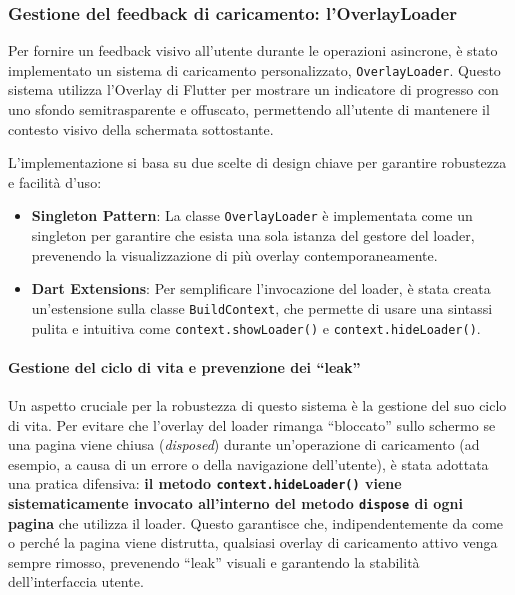 \subsubsection{Gestione del feedback di caricamento: l'OverlayLoader}
Per fornire un feedback visivo all'utente durante le operazioni asincrone, è stato implementato un sistema di caricamento personalizzato, \texttt{OverlayLoader}.
Questo sistema utilizza l'Overlay di Flutter per mostrare un indicatore di progresso con uno sfondo semitrasparente e offuscato, permettendo all'utente di mantenere il contesto visivo della schermata sottostante.

L'implementazione si basa su due scelte di design chiave per garantire robustezza e facilità d'uso:
\begin{itemize}
    \item \textbf{Singleton Pattern}: La classe \texttt{OverlayLoader} è implementata come un singleton per garantire che esista una sola istanza del gestore del loader, prevenendo la visualizzazione di più overlay contemporaneamente.
    \item \textbf{Dart Extensions}: Per semplificare l'invocazione del loader, è stata creata un'estensione sulla classe \texttt{BuildContext}, che permette di usare una sintassi pulita e intuitiva come \texttt{context.showLoader()} e \texttt{context.hideLoader()}.
\end{itemize}

\paragraph{Gestione del ciclo di vita e prevenzione dei ``leak''}
Un aspetto cruciale per la robustezza di questo sistema è la gestione del suo ciclo di vita.
Per evitare che l'overlay del loader rimanga ``bloccato'' sullo schermo se una pagina viene chiusa (\emph{disposed}) durante un'operazione di caricamento (ad esempio, a causa di un errore o della navigazione dell'utente), è stata adottata una pratica difensiva: \textbf{il metodo \texttt{context.hideLoader()} viene sistematicamente invocato all'interno del metodo \texttt{dispose} di ogni pagina} che utilizza il loader.
Questo garantisce che, indipendentemente da come o perché la pagina viene distrutta, qualsiasi overlay di caricamento attivo venga sempre rimosso, prevenendo ``leak'' visuali e garantendo la stabilità dell'interfaccia utente.

